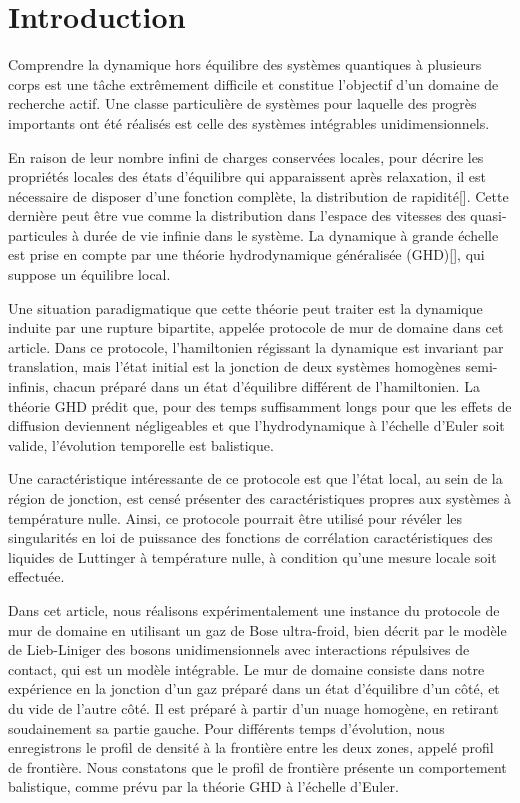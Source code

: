 \documentclass[submission, Phys]{SciPost}
\begin{document}
{\color{blue}
\section*{Introduction} 

Comprendre la dynamique hors équilibre des systèmes quantiques à plusieurs corps est une tâche extrêmement difficile et constitue l'objectif d'un domaine de recherche actif. Une classe particulière de systèmes pour laquelle des progrès importants ont été réalisés est celle des systèmes intégrables unidimensionnels. 

En raison de leur nombre infini de charges conservées locales, pour décrire les propriétés locales des états d'équilibre qui apparaissent après relaxation, il est nécessaire de disposer d'une fonction complète, la distribution de rapidité[]. Cette dernière peut être vue comme la distribution dans l'espace des vitesses des quasi-particules à durée de vie infinie dans le système. La dynamique à grande échelle est prise en compte par une théorie hydrodynamique généralisée (GHD)[], qui suppose un équilibre local.

Une situation paradigmatique que cette théorie peut traiter est la dynamique induite par une rupture bipartite\cite{bertini_transport_2016,castro-alvaredo_emergent_2016}, appelée protocole de mur de domaine dans cet article. Dans ce protocole, l'hamiltonien régissant la dynamique est invariant par translation, mais l'état initial est la jonction de deux systèmes homogènes semi-infinis, chacun préparé dans un état d'équilibre différent de l'hamiltonien. La théorie GHD prédit que, pour des temps suffisamment longs pour que les effets de diffusion deviennent négligeables\cite{de_nardis_diffusion_2019} et que l'hydrodynamique à l'échelle d'Euler soit valide, l'évolution temporelle est balistique. 

Une caractéristique intéressante de ce protocole est que l'état local, au sein de la région de jonction, est censé présenter des caractéristiques propres aux systèmes à température nulle. Ainsi, ce protocole pourrait être utilisé pour révéler les singularités en loi de puissance des fonctions de corrélation caractéristiques des liquides de Luttinger à température nulle\cite{de_nardis_edge_2018}, à condition qu'une mesure locale soit effectuée.

Dans cet article, nous réalisons expérimentalement une instance du protocole de mur de domaine en utilisant un gaz de Bose ultra-froid, bien décrit par le modèle de Lieb-Liniger des bosons unidimensionnels avec interactions répulsives de contact\cite{lieb_exact_1963,bouchoule_generalized_2022}, qui est un modèle intégrable. Le mur de domaine consiste dans notre expérience en la jonction d'un gaz préparé dans un état d'équilibre d'un côté, et du vide de l'autre côté. Il est préparé à partir d'un nuage homogène, en retirant soudainement sa partie gauche. Pour différents temps d'évolution, nous enregistrons le profil de densité à la frontière entre les deux zones, appelé profil de frontière. Nous constatons que le profil de frontière présente un comportement balistique, comme prévu par la théorie GHD à l'échelle d'Euler.

}
\end{document}

